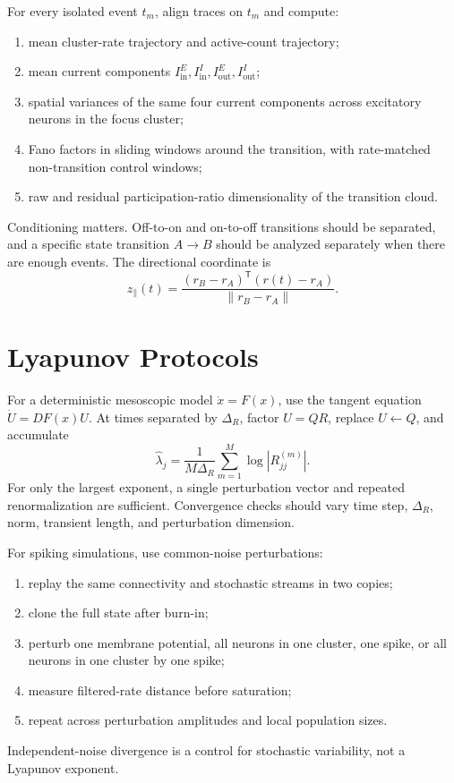 For every isolated event \(t_m\), align traces on \(t_m\) and compute:
\begin{enumerate}
    \item mean cluster-rate trajectory and active-count trajectory;
    \item mean current components
    \(I_{\mathrm{in}}^E,I_{\mathrm{in}}^I,I_{\mathrm{out}}^E,I_{\mathrm{out}}^I\);
    \item spatial variances of the same four current components across
    excitatory neurons in the focus cluster;
    \item Fano factors in sliding windows around the transition, with
    rate-matched non-transition control windows;
    \item raw and residual participation-ratio dimensionality of the
    transition cloud.
\end{enumerate}
Conditioning matters. Off-to-on and on-to-off transitions should be separated,
and a specific state transition \(A\to B\) should be analyzed separately when
there are enough events. The directional coordinate is
\[
    z_{\parallel}(t)
    =
    \frac{(r_B-r_A)^{\mathsf T}(r(t)-r_A)}{\|r_B-r_A\|}.
\]

\section{Lyapunov Protocols}
\label{appC:lyapunov}

For a deterministic mesoscopic model \(\dot x=F(x)\), use the tangent equation
\(\dot U=D F(x)U\). At times separated by \(\Delta_R\), factor \(U=QR\),
replace \(U\leftarrow Q\), and accumulate
\[
    \widehat\lambda_j
    =
    \frac{1}{M\Delta_R}\sum_{m=1}^M\log |R_{jj}^{(m)}|.
\]
For only the largest exponent, a single perturbation vector and repeated
renormalization are sufficient. Convergence checks should vary time step,
\(\Delta_R\), norm, transient length, and perturbation dimension.

For spiking simulations, use common-noise perturbations:
\begin{enumerate}
    \item replay the same connectivity and stochastic streams in two copies;
    \item clone the full state after burn-in;
    \item perturb one membrane potential, all neurons in one cluster, one
    spike, or all neurons in one cluster by one spike;
    \item measure filtered-rate distance before saturation;
    \item repeat across perturbation amplitudes and local population sizes.
\end{enumerate}
Independent-noise divergence is a control for stochastic variability, not a
Lyapunov exponent.

